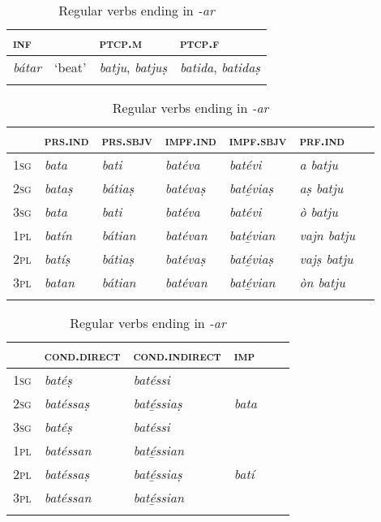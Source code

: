 \begin{table}
	\caption{Regular verbs ending in \textit{-ar}}
	\label{conjar1}
	\begin{tabularx}{\textwidth}{XXXl}
		
		\lsptoprule
		\textsc{inf} & & \textsc{ptcp.m}  & \textsc{ptcp.f}\\
		\midrule
		\textit{bátar} & `beat' & \textit{batju}, \textit{batjuṣ} & \textit{batida}, \textit{batidaṣ}\\
		\lspbottomrule  
	\end{tabularx}
	
	\medskip
	
	\begin{tabularx}{\textwidth}{Xllllll}
		\lsptoprule
		&\textsc{prs.ind} &\textsc{prs.sbjv} &\textsc{impf.ind} & \textsc{impf.sbjv} &\textsc{prf.ind}\\
		\midrule
		\textsc{1sg} & \textit{bata} & \textit{bati} & \textit{batéva} & \textit{batévi} &  \textit{a batju}\\
		\textsc{2sg} & \textit{bataṣ} & \textit{bátiaṣ} & \textit{batévaṣ} & \textit{baté̱viaṣ} & \textit{aṣ batju}\\
		\textsc{3sg} & \textit{bata} & \textit{bati} & \textit{batéva}  & \textit{batévi} & \textit{ò batju}\\
		\textsc{1pl} & \textit{batín} & \textit{bátian} & \textit{batévan} & \textit{baté̱vian} & \textit{vajn batju}\\
		\textsc{2pl} & \textit{batíṣ} & \textit{bátiaṣ} &  \textit{batévaṣ} & \textit{baté̱viaṣ} & \textit{vajṣ batju} \\
		\textsc{3pl} & \textit{batan} & \textit{bátian} & \textit{batévan} & \textit{baté̱vian} & \textit{òn batju} \\
		\lspbottomrule
	\end{tabularx}
	
	\medskip
	
	\begin{tabularx} {\textwidth}{Xlllll}
		\lsptoprule
		&\textsc{cond.direct} &  \textsc{cond.indirect}    &\textsc{imp}\\
		\midrule
		\textsc{1sg} & \textit{batéṣ} & \textit{batéssi} \\
		\textsc{2sg} & \textit{batéssaṣ} & \textit{baté̱ssiaṣ} & \textit{bata}\\
		\textsc{3sg} & \textit{batéṣ} & \textit{batéssi}\\
		\textsc{1pl} & \textit{batéssan} & \textit{baté̱ssian} \\
		\textsc{2pl} & \textit{batéssaṣ} & \textit{baté̱ssiaṣ} & \textit{batí} \\
		\textsc{3pl} & \textit{batéssan} & \textit{baté̱ssian}\\
		\lspbottomrule
	\end{tabularx} 
\end{table}

